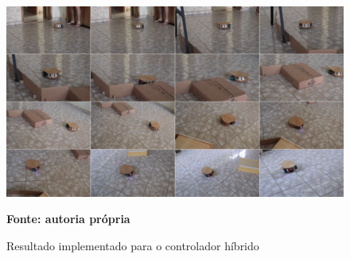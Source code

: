 \begin{figure}[ht]
\centering
\caption{Resultado implementado para o controlador híbrido}
\label{fig:resultadoImplementadoHibrido}
		\centering
		\includegraphics[clip, 
scale=0.29]{Figuras/hibridoCompactado}%

	\textbf{Fonte: autoria própria}
\end{figure}